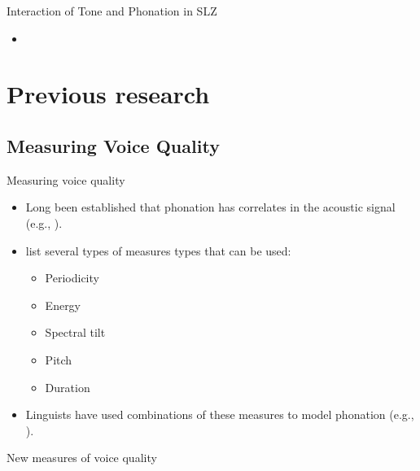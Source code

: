 \documentclass{beamer}
\begin{document}
\begin{frame}{Interaction of Tone and Phonation in SLZ}
  \begin{itemize}
    \item 
  \end{itemize}
  
\end{frame}

\section{Previous research}
\subsection{Measuring Voice Quality}

\begin{frame}{Measuring voice quality}
  \begin{itemize}
    \item Long been established that phonation has correlates in the acoustic signal (e.g., \cite{fischer-jorgensenPhoneticAnalysisBreathy1968,klattAnalysisSynthesisPerception1990}).
    \item \citet{gordonPhonationTypesCrosslinguistic2001} list several types of measures types that can be used:
    \begin{itemize}
    \item Periodicity
    \item Energy
    \item Spectral tilt
    \item Pitch
    \item Duration 
    \end{itemize}
  \item Linguists have used combinations of these measures to model phonation (e.g., \cite{blankenshipTimingNonmodalPhonation2002,brunelleTonePhonationSoutheast2016,espositoAcousticElectroglottographicStudy2012}). 
  \end{itemize}
\end{frame}

\begin{frame}{New measures of voice quality}
  
\end{frame}
\end{document}

